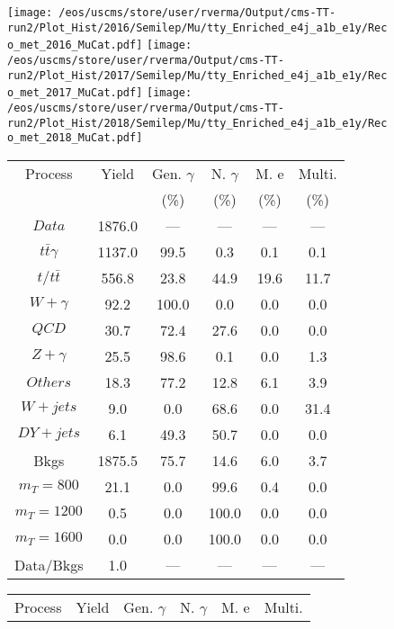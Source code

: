 \begin{figure}
\centering
\texttt{[image: /eos/uscms/store/user/rverma/Output/cms-TT-run2/Plot\_Hist/2016/Semilep/Mu/tty\_Enriched\_e4j\_a1b\_e1y/Reco\_met\_2016\_MuCat.pdf]}
\texttt{[image: /eos/uscms/store/user/rverma/Output/cms-TT-run2/Plot\_Hist/2017/Semilep/Mu/tty\_Enriched\_e4j\_a1b\_e1y/Reco\_met\_2017\_MuCat.pdf]}
\texttt{[image: /eos/uscms/store/user/rverma/Output/cms-TT-run2/Plot\_Hist/2018/Semilep/Mu/tty\_Enriched\_e4j\_a1b\_e1y/Reco\_met\_2018\_MuCat.pdf]}
\begin{minipage}[c]{0.32\textwidth}
\centering
\tiny{
\begin{tabular}{cccccc}
\hline
Process & Yield & Gen. $\gamma$ & N. $\gamma$ & M. e & Multi. \\
 &  & (\%) & (\%) & (\%) & (\%)  \\
\hline
                                                                      $ Data $ &  1876.0 &  --- &  --- &  --- &  ---\\
$ t\bar{t}\gamma $ &  1137.0 &  99.5 &  0.3 &  0.1 &  0.1\\
$ t/t\bar{t} $ &  556.8 &  23.8 &  44.9 &  19.6 &  11.7\\
$ W+\gamma $ &  92.2 &  100.0 &  0.0 &  0.0 &  0.0\\
$ QCD $ &  30.7 &  72.4 &  27.6 &  0.0 &  0.0\\
$ Z+\gamma $ &  25.5 &  98.6 &  0.1 &  0.0 &  1.3\\
$ Others $ &  18.3 &  77.2 &  12.8 &  6.1 &  3.9\\
$ W+jets $ &  9.0 &  0.0 &  68.6 &  0.0 &  31.4\\
$ DY+jets $ &  6.1 &  49.3 &  50.7 &  0.0 &  0.0\\
Bkgs &  1875.5 &  75.7 &  14.6 &  6.0 &  3.7\\
$ m_{T} = 800 $ &  21.1 &  0.0 &  99.6 &  0.4 &  0.0\\
$ m_{T} = 1200 $ &  0.5 &  0.0 &  100.0 &  0.0 &  0.0\\
$ m_{T} = 1600 $ &  0.0 &  0.0 &  100.0 &  0.0 &  0.0\\
Data/Bkgs &  1.0 &  --- &  --- &  --- &  ---\\
\hline
\end{tabular}
}
\end{minipage}
\begin{minipage}[c]{0.32\textwidth}
\centering
\tiny{
\begin{tabular}{cccccc}
\hline
Process & Yield & Gen. $\gamma$ & N. $\gamma$ & M. e & Multi. \\

\end{tabular}}
\end{minipage}
\end{figure}
